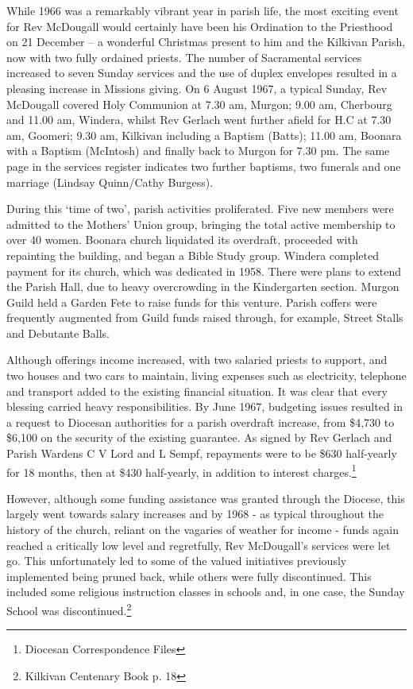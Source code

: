 While 1966 was a remarkably vibrant year in parish life, the most exciting event for Rev McDougall would certainly have been his Ordination to the Priesthood on 21 December -- a wonderful Christmas present to him and the Kilkivan Parish, now with two fully ordained priests. The number of Sacramental services increased to seven Sunday services and the use of duplex envelopes resulted in a pleasing increase in Missions giving. On 6 August 1967, a typical Sunday, Rev McDougall covered Holy Communion at 7.30 am, Murgon; 9.00 am, Cherbourg and 11.00 am, Windera, whilst Rev Gerlach went further afield for H.C at 7.30 am, Goomeri; 9.30 am, Kilkivan including a Baptism (Batts); 11.00 am, Boonara with a Baptism (McIntosh) and finally back to Murgon for 7.30 pm. The same page in the services register indicates two further baptisms, two funerals and one marriage (Lindsay Quinn/Cathy Burgess).



During this `time of two', parish activities proliferated. Five new members were admitted to the Mothers' Union group, bringing the total active membership to over 40 women. Boonara church liquidated its overdraft, proceeded with repainting the building, and began a Bible Study group. Windera completed payment for its church, which was dedicated in 1958. There were plans to extend the Parish Hall, due to heavy overcrowding in the Kindergarten section. Murgon Guild held a Garden Fete to raise funds for this venture. Parish coffers were frequently augmented from Guild funds raised through, for example, Street Stalls and Debutante Balls.



Although offerings income increased, with two salaried priests to support, and two houses and two cars to maintain, living expenses such as electricity, telephone and transport added to the existing financial situation. It was clear that every blessing carried heavy responsibilities. By June 1967, budgeting issues resulted in a request to Diocesan authorities for a parish overdraft increase, from \$4,730 to \$6,100 on the security of the existing guarantee. As signed by Rev Gerlach and Parish Wardens C V Lord and L Sempf, repayments were to be \$630 half-yearly for 18 months, then at \$430 half-yearly, in addition to interest charges.\footnote{Diocesan Correspondence Files}


However, although some funding assistance was granted through the Diocese, this largely went towards salary increases and by 1968 - as typical throughout the history of the church, reliant on the vagaries of weather for income - funds again reached a critically low level and regretfully, Rev McDougall's services were let go. This unfortunately led to some of the valued initiatives previously implemented being pruned back, while others were fully discontinued. This included some religious instruction classes in schools and, in one case, the Sunday School was discontinued.\footnote{Kilkivan Centenary Book p. 18}


